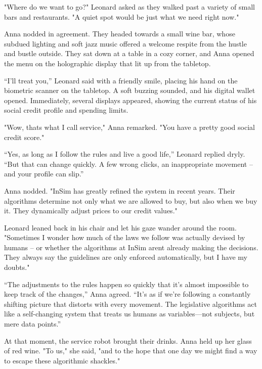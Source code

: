 \documentclass[
]{article}
\begin{document}
"Where do we want to go?" Leonard asked as they walked past a variety of small bars and restaurants. "A quiet spot would be just what we need right now."

Anna nodded in agreement. They headed towards a small wine bar, whose subdued lighting and soft jazz music offered a welcome respite from the hustle and bustle outside. They sat down at a table in a cozy corner, and Anna opened the menu on the holographic display that lit up from the tabletop.

``I'll treat you,'' Leonard said with a friendly smile, placing his hand on the biometric scanner on the tabletop. A soft buzzing sounded, and his digital wallet opened. Immediately, several displays appeared, showing the current status of his social credit profile and spending limits.

"Wow, that\textquotesingle s what I call service," Anna remarked. "You have a pretty good social credit score."

``Yes, as long as I follow the rules and live a good life,'' Leonard replied dryly. ``But that can change quickly. A few wrong clicks, an inappropriate movement -- \hspace{0pt}\hspace{0pt}and your profile can slip.''

Anna nodded. "InSim has greatly refined the system in recent years. Their algorithms determine not only what we are allowed to buy, but also when we buy it. They dynamically adjust prices to our credit values."

Leonard leaned back in his chair and let his gaze wander around the room. "Sometimes I wonder how much of the laws we follow was actually devised by humans -- or whether the algorithms at InSim aren\textquotesingle t already making the decisions. They always say the guidelines are only enforced automatically, but I have my doubts."

``The adjustments to the rules happen so quickly that it's almost impossible to keep track of the changes,'' Anna agreed. ``It's as if we're following a constantly shifting picture that distorts with every movement. The legislative algorithms act like a self-changing system that treats us humans as variables---not subjects, but mere data points.''

At that moment, the service robot brought their drinks. Anna held up her glass of red wine. "To us," she said, "and to the hope that one day we might find a way to escape these algorithmic shackles."
\end{document}
